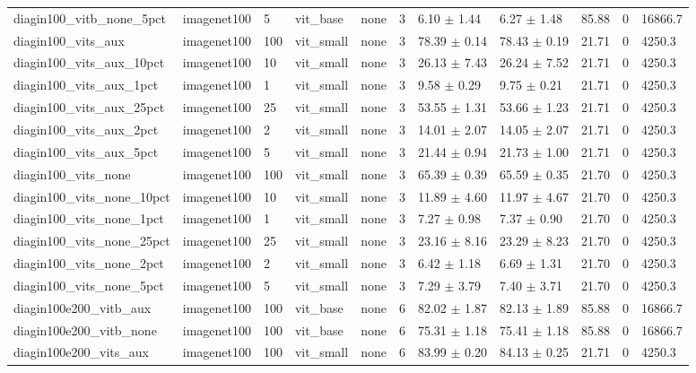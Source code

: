 \begin{tabular}{lllllllllll}
diagin100_vitb_none_5pct & imagenet100 & 5 & vit_base & none & 3 & 6.10 $\pm$ 1.44 & 6.27 $\pm$ 1.48 & 85.88 & 0 & 16866.7 \\
diagin100_vits_aux & imagenet100 & 100 & vit_small & none & 3 & 78.39 $\pm$ 0.14 & 78.43 $\pm$ 0.19 & 21.71 & 0 & 4250.3 \\
diagin100_vits_aux_10pct & imagenet100 & 10 & vit_small & none & 3 & 26.13 $\pm$ 7.43 & 26.24 $\pm$ 7.52 & 21.71 & 0 & 4250.3 \\
diagin100_vits_aux_1pct & imagenet100 & 1 & vit_small & none & 3 & 9.58 $\pm$ 0.29 & 9.75 $\pm$ 0.21 & 21.71 & 0 & 4250.3 \\
diagin100_vits_aux_25pct & imagenet100 & 25 & vit_small & none & 3 & 53.55 $\pm$ 1.31 & 53.66 $\pm$ 1.23 & 21.71 & 0 & 4250.3 \\
diagin100_vits_aux_2pct & imagenet100 & 2 & vit_small & none & 3 & 14.01 $\pm$ 2.07 & 14.05 $\pm$ 2.07 & 21.71 & 0 & 4250.3 \\
diagin100_vits_aux_5pct & imagenet100 & 5 & vit_small & none & 3 & 21.44 $\pm$ 0.94 & 21.73 $\pm$ 1.00 & 21.71 & 0 & 4250.3 \\
diagin100_vits_none & imagenet100 & 100 & vit_small & none & 3 & 65.39 $\pm$ 0.39 & 65.59 $\pm$ 0.35 & 21.70 & 0 & 4250.3 \\
diagin100_vits_none_10pct & imagenet100 & 10 & vit_small & none & 3 & 11.89 $\pm$ 4.60 & 11.97 $\pm$ 4.67 & 21.70 & 0 & 4250.3 \\
diagin100_vits_none_1pct & imagenet100 & 1 & vit_small & none & 3 & 7.27 $\pm$ 0.98 & 7.37 $\pm$ 0.90 & 21.70 & 0 & 4250.3 \\
diagin100_vits_none_25pct & imagenet100 & 25 & vit_small & none & 3 & 23.16 $\pm$ 8.16 & 23.29 $\pm$ 8.23 & 21.70 & 0 & 4250.3 \\
diagin100_vits_none_2pct & imagenet100 & 2 & vit_small & none & 3 & 6.42 $\pm$ 1.18 & 6.69 $\pm$ 1.31 & 21.70 & 0 & 4250.3 \\
diagin100_vits_none_5pct & imagenet100 & 5 & vit_small & none & 3 & 7.29 $\pm$ 3.79 & 7.40 $\pm$ 3.71 & 21.70 & 0 & 4250.3 \\
diagin100e200_vitb_aux & imagenet100 & 100 & vit_base & none & 6 & 82.02 $\pm$ 1.87 & 82.13 $\pm$ 1.89 & 85.88 & 0 & 16866.7 \\
diagin100e200_vitb_none & imagenet100 & 100 & vit_base & none & 6 & 75.31 $\pm$ 1.18 & 75.41 $\pm$ 1.18 & 85.88 & 0 & 16866.7 \\
diagin100e200_vits_aux & imagenet100 & 100 & vit_small & none & 6 & 83.99 $\pm$ 0.20 & 84.13 $\pm$ 0.25 & 21.71 & 0 & 4250.3 \\

\end{tabular}

